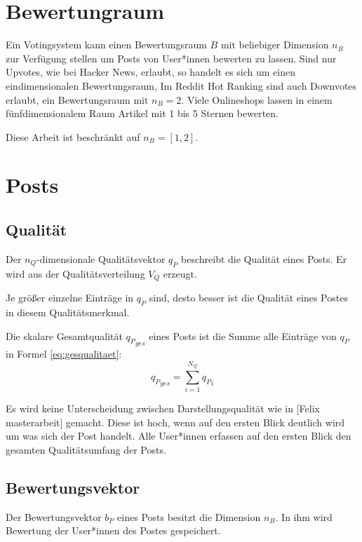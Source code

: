 \section{Bewertungraum}

Ein Votingsystem kann einen Bewertungsraum $B$ mit beliebiger Dimension $n_B$ zur Verfügung stellen um Posts von User*innen bewerten zu lassen. Sind nur Upvotes, wie bei Hacker News, erlaubt, so handelt es sich um einen eindimensionalen Bewertungsraum, Im Reddit Hot Ranking sind auch Downvotes erlaubt, ein Bewertungsraum mit $n_B = 2$. Viele Onlineshops lassen in einem fünfdimensionalem Raum Artikel mit 1 bis 5 Sternen bewerten.

Diese Arbeit ist beschränkt auf $n_B = [1,2]$. 


\section{Posts}

\subsection{Qualität}
\label{pqualitaet}

Der $n_Q$-dimensionale Qualitätsvektor $q_P$ beschreibt die Qualität eines Posts. Er wird aus der Qualitätsverteilung $V_Q$ erzeugt. 

Je größer einzelne Einträge in $q_P$ sind, desto besser ist die Qualität eines Postes in diesem Qualitätsmerkmal.

Die skalare Gesamtqualität ${q_P}_{ges}$ eines Posts ist die Summe alle Einträge von $q_P$ in Formel \ref{eq:gesqualitaet}:
\begin{equation}
\label{eq:gesqualitaet}
{q_P}_{ges} = \sum_{i=1}^{N_Q} {q_P}_i
\end{equation}

Es wird keine Unterscheidung zwischen Darstellungsqualität wie in [Felix masterarbeit] gemacht. Diese ist hoch, wenn auf den ersten Blick deutlich wird um was sich der Post handelt. Alle User*innen erfassen auf den ersten Blick den gesamten Qualitätsumfang der Posts.




\subsection{Bewertungsvektor}

Der Bewertungsvektor $b_P$ eines Posts besitzt die Dimension $n_B$. In ihm wird Bewertung der User*innen des Postes gespeichert.

